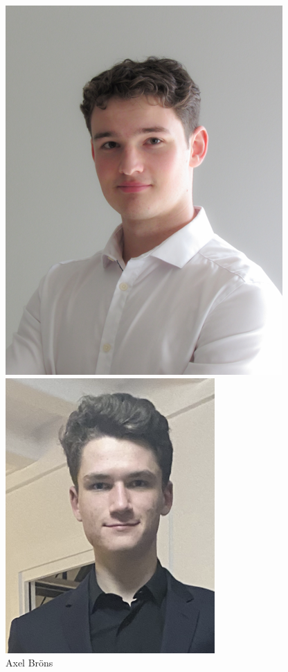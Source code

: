 \documentclass[a4paper,11pt]{article}
\begin{document}
\begin{figure}[H]
\begin{minipage}{0.20\textwidth}
\centering
\includegraphics[scale=0.7]{images/axel.png}
\caption*{Axel Bröns}
\end{minipage}
\hfill
\begin{minipage}{0.20\textwidth}
\centering
\includegraphics[scale=0.7]{images/valentin.png}

\end{minipage}
\end{figure}
\end{document}
